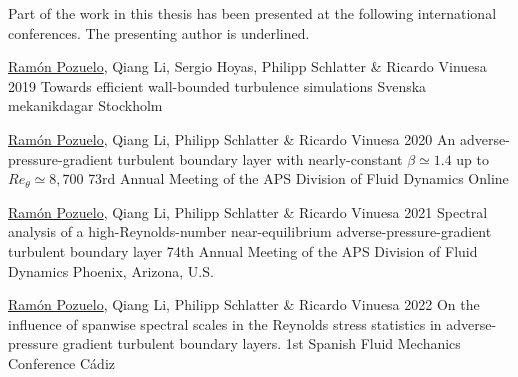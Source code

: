 %
\begin{conferences}
	Part of the work in this thesis has been presented at the following 
	international conferences. The presenting author is underlined.

  \conferenceitem%
    {\underline{Ram\'on Pozuelo}, Qiang Li, Sergio Hoyas, Philipp Schlatter \& Ricardo Vinuesa}%
    {2019}%
    {Towards efficient wall-bounded turbulence simulations}%
    {Svenska mekanikdagar}%
    {Stockholm}%
    
  \conferenceitem%
    {\underline{Ram\'on Pozuelo}, Qiang Li, Philipp Schlatter \& Ricardo Vinuesa}%
    {2020}%
    {An adverse-pressure-gradient turbulent boundary layer with nearly-constant $\beta \simeq 1.4$ up to $Re_{\theta} \simeq 8,700$}%
    {73rd Annual Meeting of the APS Division of Fluid Dynamics}%
    {Online}%
    
  \conferenceitem%
    {\underline{Ram\'on Pozuelo}, Qiang Li, Philipp Schlatter \& Ricardo Vinuesa}%
    {2021}%
    {Spectral analysis of a high-Reynolds-number near-equilibrium adverse-pressure-gradient turbulent boundary layer}%
    {74th Annual Meeting of the APS Division of Fluid Dynamics}%
    {Phoenix, Arizona, U.S.}%
    
  \conferenceitem%
    {\underline{Ram\'on Pozuelo}, Qiang Li, Philipp Schlatter \& Ricardo Vinuesa}%
    {2022}%
    {On the influence of spanwise spectral scales in the Reynolds stress statistics in adverse-pressure gradient turbulent boundary layers.}%
    {1st Spanish Fluid Mechanics Conference}%
    {C\'adiz}%
\end{conferences}

%
\tableofcontents
